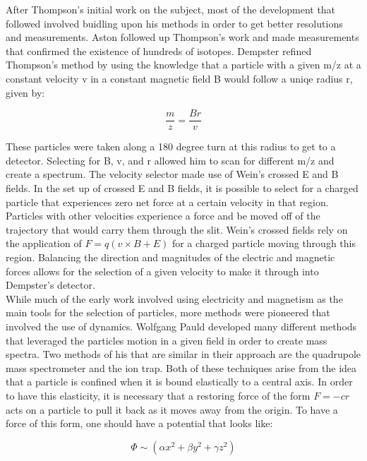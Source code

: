 \documentclass[12pt]{amsart}
\begin{document}
After Thompson's initial work on the subject, most of the development that followed involved buidling upon his methods in order to get better resolutions and measurements. Aston followed up Thompson's work and made measurements that confirmed the existence of hundreds of isotopes. Dempster refined Thompson's method by using the knowledge that a particle with a given m/z at a constant velocity v in a constant magnetic field B would follow a uniqe radius r, given by:

\begin{equation}
\frac{m}{z}=\frac{Br}{v}
\end{equation}

These particles were taken along a 180 degree turn at this radius to get to a detector. Selecting for B, v, and r allowed him to scan for different m/z and create a spectrum. The velocity selector made use of Wein's crossed E and B fields.\cite{collo} In the set up of crossed E and B fields, it is possible to select for a charged particle that experiences zero net force at a certain velocity in that region. Particles with other velocities experience a force and be moved off of the trajectory that would carry them through the slit.\cite{AMS}  Wein's crossed fields rely on the application of $F = q(v\times B + E)$ for a charged particle moving through this region. Balancing the direction and magnitudes of the electric and magnetic forces allows for the selection of a given velocity to make it through into Dempster's detector.\\

While much of the early work involved using electricity and magnetism as the main tools for the selection of particles, more methods were pioneered that involved the use of dynamics. Wolfgang Pauld developed many different methods that leveraged the particles motion in a given field in order to create mass spectra. Two methods of his that are similar in their approach are the quadrupole mass spectrometer and the ion trap. Both of these techniques arise from the idea that a particle is confined when it is bound elastically to a central axis. In order to have this elasticity, it is necessary that a restoring force of the form $F=-cr$ acts on a particle to pull it back as it moves away from the origin. To have a force of this form, one should have a potential that looks like:

\begin{equation}
\Phi \sim (\alpha x^2 + \beta y^2 + \gamma z^2)
\end{equation}
\end{document}
